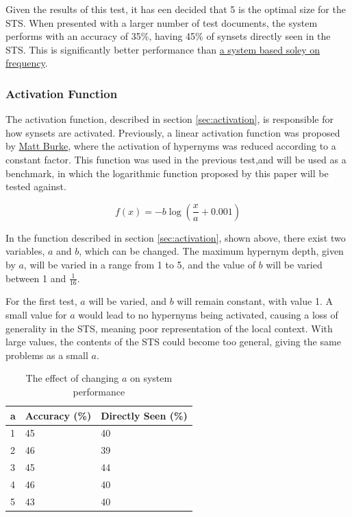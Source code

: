 \documentclass[]{article}
\begin{document}
Given the results of this test, it has een decided that 5 is the optimal size for the STS. When presented with a larger number of test documents, the system performs with an accuracy of 35\%, having 45\% of synsets directly seen in the STS. This is significantly better performance than \hyperref[sec:EvFrequency]{ a system based soley on frequency}.

\subsubsection{Activation Function}
\label{sec:EvActivation}
The activation function, described in section \ref{sec:activation}, is responsible for how synsets are activated. Previously, a linear activation function was proposed by \hyperref[sec:MattBurke]{Matt Burke}, where the activation of hypernyms was reduced according to a constant factor. This function was used in the previous test,and will be used as a benchmark, in which the logarithmic function proposed by this paper will be tested against. 

\[f(x) = -b\log(\frac{x}{a}+0.001)\]

In the function described in section \ref{sec:activation}, shown above, there exist two variables, $a$ and $b$, which can be changed. The maximum hypernym depth, given by $a$, will be varied in a range from 1 to 5, and the value of $b$ will be varied between 1 and $\frac{1}{16}$.

For the first test, $a$ will be varied, and $b$ will remain constant, with value 1. A small value for $a$ would lead to no hypernyms being activated, causing a loss of generality in the STS, meaning poor representation of the local context. With large values, the contents of the STS could become too general, giving the same problems as a small $a$.

\begin{table}
\begin{center}
\begin{tabular}{|p{2em}|p{7em}|p{7em}|}
	\hline
	a & Accuracy (\%) & Directly Seen (\%) \\
	\hline
	1 & 45 & 40\\
	\hline
	2 & 46 & 39\\
	\hline
	3 & 45 & 44\\
	\hline
	4 & 46 & 40\\
	\hline
	5 & 43 & 40\\
	\hline
\end{tabular}
\end{center}
\caption{The effect of changing $a$ on system performance}
\label{table:aActivation}
\end{table}
\end{document}
